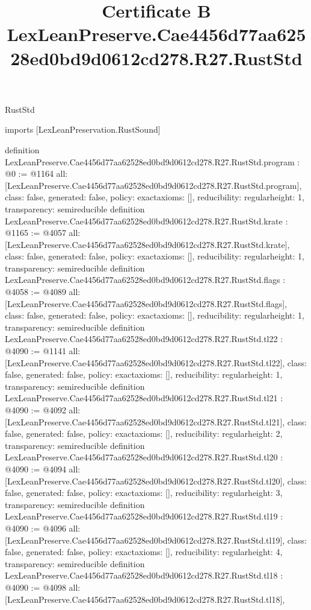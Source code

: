 \begin{lexlean}{RustStd}
\title{Certificate B LexLeanPreserve.Cae4456d77aa62528ed0bd9d0612cd278.R27.RustStd}
\begin{coremodule}
imports [LexLeanPreservation.RustSound]

definition LexLeanPreserve.Cae4456d77aa62528ed0bd9d0612cd278.R27.RustStd.program : @0 := @1164 {
  all: [LexLeanPreserve.Cae4456d77aa62528ed0bd9d0612cd278.R27.RustStd.program],
  class: false,
  generated: false,
  policy: exact{axioms: []},
  reducibility: regular{height: 1},
  transparency: semireducible
}
definition LexLeanPreserve.Cae4456d77aa62528ed0bd9d0612cd278.R27.RustStd.krate : @1165 := @4057 {
  all: [LexLeanPreserve.Cae4456d77aa62528ed0bd9d0612cd278.R27.RustStd.krate],
  class: false,
  generated: false,
  policy: exact{axioms: []},
  reducibility: regular{height: 1},
  transparency: semireducible
}
definition LexLeanPreserve.Cae4456d77aa62528ed0bd9d0612cd278.R27.RustStd.flags : @4058 := @4089 {
  all: [LexLeanPreserve.Cae4456d77aa62528ed0bd9d0612cd278.R27.RustStd.flags],
  class: false,
  generated: false,
  policy: exact{axioms: []},
  reducibility: regular{height: 1},
  transparency: semireducible
}
definition LexLeanPreserve.Cae4456d77aa62528ed0bd9d0612cd278.R27.RustStd.tl22 : @4090 := @1141 {
  all: [LexLeanPreserve.Cae4456d77aa62528ed0bd9d0612cd278.R27.RustStd.tl22],
  class: false,
  generated: false,
  policy: exact{axioms: []},
  reducibility: regular{height: 1},
  transparency: semireducible
}
definition LexLeanPreserve.Cae4456d77aa62528ed0bd9d0612cd278.R27.RustStd.tl21 : @4090 := @4092 {
  all: [LexLeanPreserve.Cae4456d77aa62528ed0bd9d0612cd278.R27.RustStd.tl21],
  class: false,
  generated: false,
  policy: exact{axioms: []},
  reducibility: regular{height: 2},
  transparency: semireducible
}
definition LexLeanPreserve.Cae4456d77aa62528ed0bd9d0612cd278.R27.RustStd.tl20 : @4090 := @4094 {
  all: [LexLeanPreserve.Cae4456d77aa62528ed0bd9d0612cd278.R27.RustStd.tl20],
  class: false,
  generated: false,
  policy: exact{axioms: []},
  reducibility: regular{height: 3},
  transparency: semireducible
}
definition LexLeanPreserve.Cae4456d77aa62528ed0bd9d0612cd278.R27.RustStd.tl19 : @4090 := @4096 {
  all: [LexLeanPreserve.Cae4456d77aa62528ed0bd9d0612cd278.R27.RustStd.tl19],
  class: false,
  generated: false,
  policy: exact{axioms: []},
  reducibility: regular{height: 4},
  transparency: semireducible
}
definition LexLeanPreserve.Cae4456d77aa62528ed0bd9d0612cd278.R27.RustStd.tl18 : @4090 := @4098 {
  all: [LexLeanPreserve.Cae4456d77aa62528ed0bd9d0612cd278.R27.RustStd.tl18],
}
\end{coremodule}
\end{lexlean}
